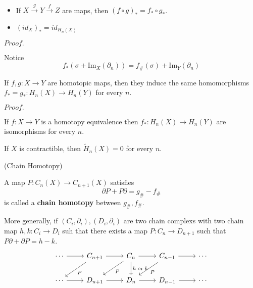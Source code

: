 \documentclass{article}
\newcommand{\Pf}[1]{$Proof.$\par}
\begin{document}
\begin{proposition}\ \par
    \begin{itemize}
        \item If $X\overset{g}{\rightarrow}Y\overset{f}{\rightarrow}Z$ are maps, then $(f\circ g)_* = f_* \circ g_*$.
        \item $(id_X)_* = id_{H_n(X)}$
    \end{itemize}
\end{proposition}
\Pf\par
    Notice
    \[f_*(\sigma + \text{Im}_X(\partial_n)) = f_{\#}(\sigma) + \text{Im}_Y(\partial_n) \]

\begin{theorem}
    If $f,g:X\to Y$ are homotopic maps, then they induce the same homomorphisms $f_* = g_*:H_n(X)\to H_n(Y)$ for every $n$.
\end{theorem}
\Pf\par

\begin{corollary}
    If $f:X\to Y$ is a homotopy equivalence then $f_*:H_n(X)\to H_n(Y)$ are isomorphisms for every $n$.
\end{corollary}

\begin{corollary}
    If $X$ is contractible, then $\widetilde{H}_n(X) = 0$ for every $n$.
\end{corollary}

\begin{definition}(Chain Homotopy)\par
    A map $P:C_n(X) \to C_{n+1}(X)$ satisfies
    \[\partial P + P\partial = g_{\#} - f_{\#}\]
    is called a \textbf{chain homotopy} between $g_{\#}, f_{\#}$.\par
    More generally, if $(C_i,\partial_i), (D_i,\partial_i)$ are two chain complexs with two chain map $h,k:C_i \to D_i$ suh that there exists a map $P:C_n\to D_{n+1}$ such that $P\partial + \partial P = h-k$.
    \[
    \begin{tikzcd}
        \cdots\arrow[r] & C_{n+1}\arrow[r]\arrow[ld,"P"] & C_n\arrow[r]\arrow[d,"h\text{ or }k"]\arrow[ld,"P"] & C_{n-1}\arrow[r]\arrow[ld,"P"] & \cdots \\
        \cdots\arrow[r] & D_{n+1}\arrow[r] & D_n\arrow[r] & D_{n-1}\arrow[r] & \cdots \\
    \end{tikzcd}
    \]
\end{definition}
\end{document}
